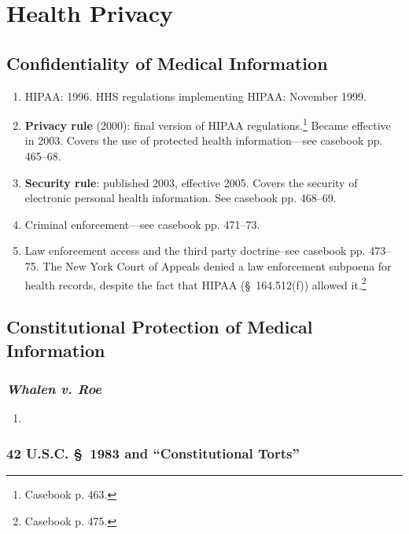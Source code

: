 \section{Health Privacy}

\subsection{Confidentiality of Medical Information}

\begin{enumerate}
    \item HIPAA: 1996. HHS regulations implementing HIPAA: November 1999.
    \item \textbf{Privacy rule} (2000): final version of HIPAA 
    regulations.\footnote{Casebook p. 463.} Became effective in 2003. Covers the 
    use of protected health information---see casebook pp. 465--68.
    \item \textbf{Security rule}: published 2003, effective 2005. Covers the 
    security of electronic personal health information. See casebook pp. 
    468--69.
    \item Criminal enforcement---see casebook pp. 471--73.
    \item Law enforcement access and the third party doctrine--see casebook pp. 
    473--75. The New York Court of Appeals denied a law enforcement subpoena for 
    health records, despite the fact that HIPAA (\S\ 164.512(f)) allowed 
    it.\footnote{Casebook p. 475.}
\end{enumerate}

\subsection{Constitutional Protection of Medical Information}

\subsubsection{\emph{Whalen v. Roe}}

\begin{enumerate}
    \item %
\end{enumerate}

\subsubsection{42 U.S.C. \S\ 1983 and ``Constitutional Torts''}

